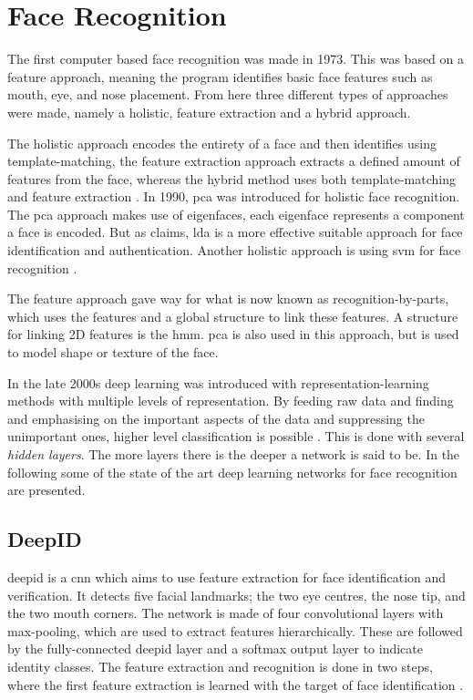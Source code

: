 \section{Face Recognition}
The first computer based face recognition was made in 1973. This was based on a feature approach, meaning the program identifies basic face features such as mouth, eye, and nose placement. 
From here three different types of approaches were made, namely a holistic, feature extraction and a hybrid approach. 

The holistic approach encodes the entirety of a face and then identifies using template-matching, the feature extraction approach extracts a defined amount of features from the face, whereas the hybrid method uses both template-matching and feature extraction \citep{Wechsler2007}.
In 1990, \gls{pca} was introduced for holistic face recognition. The \gls{pca} approach makes use of eigenfaces, each eigenface represents a component a face is encoded. But as \cite{Wechsler2007} claims, \gls{lda} is a more effective suitable approach for face identification and authentication. Another holistic approach is using \gls{svm} for face recognition \citep{Wechsler2007}.

The feature approach gave way for what is now known as recognition-by-parts, which uses the features and a global structure to link these features. A structure for linking 2D features is the \gls{hmm}. \gls{pca} is also used in this approach, but is used to model shape or texture of the face.

In the late 2000s deep learning was introduced with representation-learning methods with multiple levels of representation. By feeding raw data and finding and emphasising on the important aspects of the data and suppressing the unimportant ones, higher level classification is possible \citep{LeCun2015}. This is done with several \textit{hidden layers}. The more layers there is the deeper a network is said to be. In the following some of the state of the art deep learning networks for face recognition are presented.

\subsection{DeepID}
\gls{deepid} is a \gls{cnn} which aims to use feature extraction for face identification and verification. It detects five facial landmarks; the two eye centres, the nose tip, and the two mouth corners. The network is made of four convolutional layers with max-pooling, which are used to extract features hierarchically. These are followed by the fully-connected \gls{deepid} layer and a softmax output layer to indicate identity classes. The feature extraction and recognition is done in two steps, where the first feature extraction is learned with the target of face identification \citep{deepID2014}.

